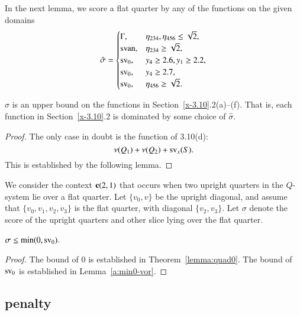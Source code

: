 In the next lemma, we score a flat quarter by any of the functions
on the given domains
     $$\hat\sigma=
        \begin{cases}
            \Gamma,& \eta_{234},\eta_{456}\le\sqrt2,\\
             {\operatorname{svan}}, &\eta_{234}\ge\sqrt2,\\
            {\operatorname{sv}}_0, & y_4\ge 2.6, y_1\ge2.2,\\
            {\operatorname{sv}}_0, & y_4\ge 2.7,\\
            {\operatorname{sv}}_0,& \eta_{456}\ge\sqrt2.
        \end{cases}
    $$

\begin{lemma}
    \label{lemma:hatsigma}
$\hat\sigma$ is an upper bound on the functions in
Section~\ref{x-3.10}.2(a)--(f). That is, each function in
Section~\ref{x-3.10}.2 is dominated by some choice of $\hat\sigma$.
\end{lemma}

\begin{proof}  The only case in doubt is the function of 3.10(d):
$$\nu(Q_1)+\nu(Q_2)+{\operatorname{sv}}_x(S).$$ This is established by the
following lemma.
\end{proof}


We consider the context ${\operatorname{\bf c}}{(2,1)}$ that occurs when two upright
quarters in the $Q$-system lie over a flat quarter. Let $\{v_0,v\}$ be
the upright diagonal, and assume that $\{v_0,v_1,v_2,v_3\}$ is the
flat quarter, with diagonal $\{v_2,v_3\}$. Let $\sigma$ denote the
score of the upright quarters and other slice lying
over the flat quarter.

\begin{lemma}\label{lemma:min0-svor}
    $\sigma\le \min(0,{\operatorname{sv}}_0)$.
\end{lemma}

\begin{proof}
The bound of $0$ is established in Theorem~\ref{lemma:quad0}.
The bound of ${\operatorname{sv}}_0$ is established in Lemma~\ref{a:min0-vor}.
\end{proof}






\subsection{penalty} %
\label{sec:4.2} \label{sec:penalty}

